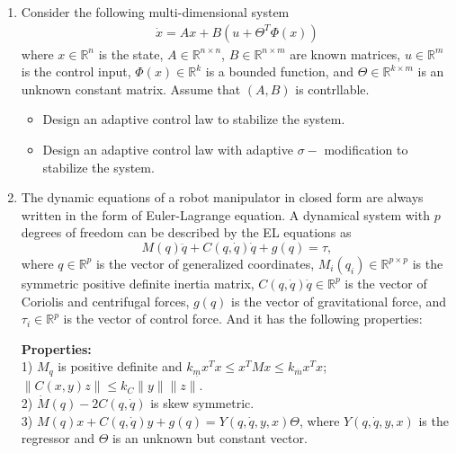 \documentclass[a4paper,11pt]{article}
\newcommand{\re}{\mathbb{R}}
\newtheorem{corollary}[theorem]{Corollary}
\begin{document}
\begin{enumerate}
\begin{itemize}
 \begin{corollary}
 If $x\in \mathbb{L}_2\bigcap\mathbb{L}_{\infty}$ and $\dot x\in \mathbb{L}_{\infty}$, then $\lim_{t\to\infty}x(t)=0$.
 \end{corollary}
\end{itemize}



\item Consider the following multi-dimensional system
\begin{align*}
\dot x = A x +B(u+\Theta^T\Phi(x))
\end{align*}
where $x\in\re^n$ is the state, $A\in\re^{n\times n}$, $B\in\re^{n\times m}$ are known matrices, $u\in\re^m$ is the control input, $\Phi(x)\in\re^{k}$ is a bounded function, and $\Theta\in \re^{k\times m}$ is an unknown constant matrix. Assume that $(A,B)$ is contrllable.
\begin{itemize}
  \item Design an adaptive control law to stabilize the system.
  \item Design an adaptive control law with adaptive $\sigma-$ modification to stabilize the system.
\end{itemize}

\item The dynamic equations of a robot manipulator in closed form are always written in the form of Euler-Lagrange equation. A dynamical system with $p$ degrees of freedom can be described
   by the EL equations as
   \begin{equation}\label{system}
    M(q)\ddot q+C(q,\dot q)\dot
    q+g(q)=\tau,
    \end{equation}
where $q\in \mathbb{R}^p$ is the vector of generalized
coordinates, $M_i(q_i)\in\mathbb{R}^{p\times p}$ is the symmetric
positive definite inertia matrix, $C(q,\dot q)\dot q\in
\mathbb{R}^p$ is the vector of Coriolis and centrifugal forces,
$g(q)$ is the vector of gravitational force, and $\tau_i\in
\mathbb{R}^p$ is the vector of control force. And it has the following properties:

\vspace{0.3cm}

{\bf Properties:}\\
  1) $M_q$ is positive definite and $k_{\underline{m}}x^Tx\leq x^TMx\leq k_{\overline{m}}x^Tx$; $\|C(x,y)z\|\leq k_C\|y\|\|z\|$. \\
  2) $\dot M(q)-2C(q,\dot q)$ is skew symmetric. \\
 3) $M(q)x+C(q,\dot q)y+g(q)=Y(q,\dot q,y,x)\Theta$,
where $Y(q,\dot q,y,x)$ is the regressor and $\Theta$ is an unknown but
constant vector.


\end{enumerate}
\end{document}
